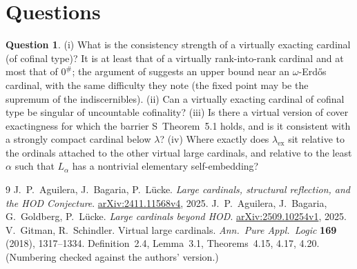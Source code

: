 \documentclass[11pt,letterpaper]{article}
\theoremstyle{definition}
\newtheorem{question}[definition]{Question}
\numberwithin{equation}{section}
\newcommand{\arxiv}[1]{\href{https://arxiv.org/abs/#1}{arXiv:#1}}
\begin{document}
\section{Questions}

\begin{question}
(i) What is the consistency strength of a virtually exacting cardinal (of cofinal type)? It is at least that of a virtually rank-into-rank cardinal and at most that of $0^\#$; the argument of \cite[Thm.~4.17]{gs} suggests an upper bound near an $\omega$-Erd\H os cardinal, with the same difficulty they note (the fixed point may be the supremum of the indiscernibles). (ii) Can a virtually exacting cardinal of cofinal type be singular of uncountable cofinality? (iii) Is there a virtual version of cover exactingness for which the barrier S~Theorem~5.1 holds, and is it consistent with a strongly compact cardinal below $\lambda$? (iv) Where exactly does $\lambda_{\mathrm{ex}}$ sit relative to the ordinals attached to the other virtual large cardinals, and relative to the least $\alpha$ such that $L_\alpha$ has a nontrivial elementary self-embedding?
\end{question}

\begin{thebibliography}{9}
 J.~P.~Aguilera, J.~Bagaria, P.~L\"ucke. \emph{Large cardinals, structural reflection, and the HOD Conjecture}. \arxiv{2411.11568v4}, 2025.
 J.~P.~Aguilera, J.~Bagaria, G.~Goldberg, P.~L\"ucke. \emph{Large cardinals beyond HOD}. \arxiv{2509.10254v1}, 2025.
 V.~Gitman, R.~Schindler. Virtual large cardinals. \emph{Ann.\ Pure Appl.\ Logic} \textbf{169} (2018), 1317--1334. Definition~2.4, Lemma~3.1, Theorems~4.15, 4.17, 4.20. (Numbering checked against the authors' version.)
\end{thebibliography}
\end{document}
